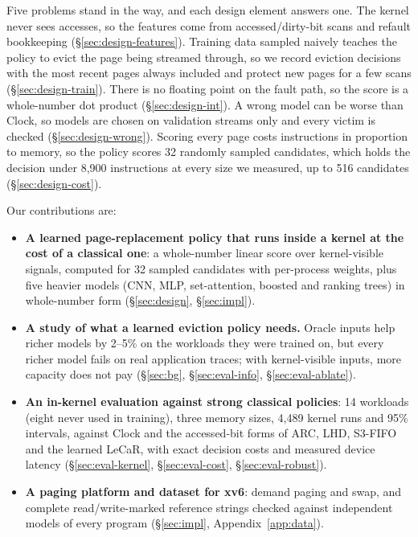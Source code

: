 \documentclass{article}
\newcommand{\clock}{Clock\xspace}
\begin{document}
Five problems stand in the way, and each design element answers one. The kernel never
sees accesses, so the features come from accessed/dirty-bit scans and refault
bookkeeping (\S\ref{sec:design-features}). Training data sampled naively teaches the
policy to evict the page being streamed through, so we record eviction decisions with
the most recent pages always included and protect new pages for a few scans
(\S\ref{sec:design-train}). There is no floating point on the fault path, so the score
is a whole-number dot product (\S\ref{sec:design-int}). A wrong model can be worse than
\clock, so models are chosen on validation streams only and every victim is checked
(\S\ref{sec:design-wrong}). Scoring every page costs instructions in proportion to
memory, so the policy scores 32 randomly sampled candidates, which holds the decision under
8,900 instructions at every size we measured, up to 516 candidates (\S\ref{sec:design-cost}).

Our contributions are:
\begin{itemize}
\item \textbf{A learned page-replacement policy that runs inside a kernel at the cost of a
  classical one}: a whole-number linear score over kernel-visible signals, computed for 32
  sampled candidates with per-process weights, plus five heavier models (CNN, MLP,
  set-attention, boosted and ranking trees) in whole-number form (\S\ref{sec:design},
  \S\ref{sec:impl}).
\item \textbf{A study of what a learned eviction policy needs.} Oracle inputs help
  richer models by 2--5\% on the workloads they were trained on, but every richer model
  fails on real application traces; with kernel-visible inputs, more capacity does not pay
  (\S\ref{sec:bg}, \S\ref{sec:eval-info}, \S\ref{sec:eval-ablate}).
\item \textbf{An in-kernel evaluation against strong classical policies}: 14 workloads
  (eight never used in training), three memory sizes, 4,489 kernel runs and 95\%
  intervals, against \clock and the accessed-bit forms of ARC, LHD, S3-FIFO and the
  learned LeCaR, with exact decision costs and measured device latency (\S\ref{sec:eval-kernel},
  \S\ref{sec:eval-cost}, \S\ref{sec:eval-robust}).
\item \textbf{A paging platform and dataset for xv6}: demand paging and swap, and
  complete read/write-marked reference strings checked against independent models of
  every program (\S\ref{sec:impl}, Appendix~\ref{app:data}).
\end{itemize}
\end{document}
